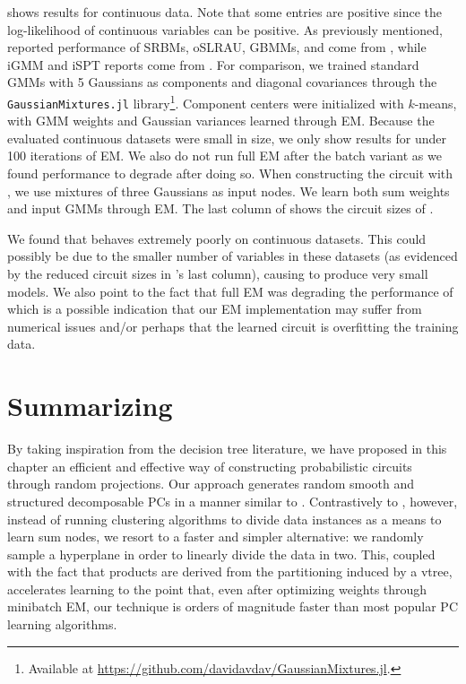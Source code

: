  shows results for continuous data. Note that some entries are positive since the
log-likelihood of continuous variables can be positive. As previously mentioned, reported
performance of SRBMs, oSLRAU, GBMMs, and  come from \citet{jaini18a}, while
iGMM and iSPT reports come from \citet{trapp16}. For comparison, we trained standard GMMs with 5
Gaussians as components and diagonal covariances through the \texttt{GaussianMixtures.jl}
library\footnote{Available at \url{https://github.com/davidavdav/GaussianMixtures.jl}.}. Component
centers were initialized with $k$-means, with GMM weights and Gaussian variances learned through
EM. Because the evaluated continuous datasets were small in size, we only show results for
 under 100 iterations of EM. We also do not run full EM after the batch variant
as we found performance to degrade after doing so. When constructing the circuit with
, we use mixtures of three Gaussians as input nodes. We learn both sum weights
and input GMMs through EM. The last column of  shows the circuit sizes of
.

We found that  behaves extremely poorly on continuous datasets. This could
possibly be due to the smaller number of variables in these datasets (as evidenced by the reduced
circuit sizes in 's last column), causing  to produce very small
models. We also point to the fact that full EM was degrading the performance of 
which is a possible indication that our EM implementation may suffer from numerical issues and/or
perhaps that the learned circuit is overfitting the training data.

\section{Summarizing }

By taking inspiration from the decision tree literature, we have proposed in this chapter an
efficient and effective way of constructing probabilistic circuits through random projections. Our
approach generates random smooth and structured decomposable PCs in a manner similar to
. Contrastively to , however, instead of running clustering
algorithms to divide data instances as a means to learn sum nodes, we resort to a faster and
simpler alternative: we randomly sample a hyperplane in order to linearly divide the data in two.
This, coupled with the fact that products are derived from the partitioning induced by a vtree,
accelerates learning to the point that, even after optimizing weights through minibatch EM, our
technique is orders of magnitude faster than most popular PC learning algorithms.

